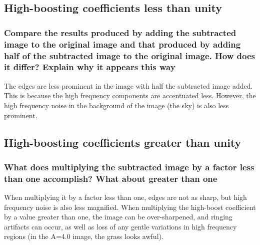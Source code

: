 \clearpage
\subsection{High-boosting coefficients less than unity}

\begin{figure}[ht]
\centering
\end{figure}
\subsubsection{Compare the results produced by adding the subtracted image to the original image and that produced by adding half of the subtracted image to the original image. How does it differ? Explain why it appears this way}
The edges are less prominent in the image with half the subtracted image added. This is because the high frequency components are accentuated less. However, the high frequency noise in the background of the image (the sky) is also less prominent.

\clearpage
\subsection{High-boosting coefficients greater than unity}
\begin{figure}[ht]
\centering
\end{figure}

\subsubsection{What does multiplying the subtracted image by a factor less than one accomplish? What about greater than one}

When multiplying it by a factor less than one, edges are not as sharp, but high frequency noise is also less magnified. When multiplying the high-boost coefficient by a value greater than one, the image can be over-sharpened, and ringing artifacts can occur, as well as loss of any gentle variations in high frequency regions (in the A=4.0 image, the grass looks awful).
